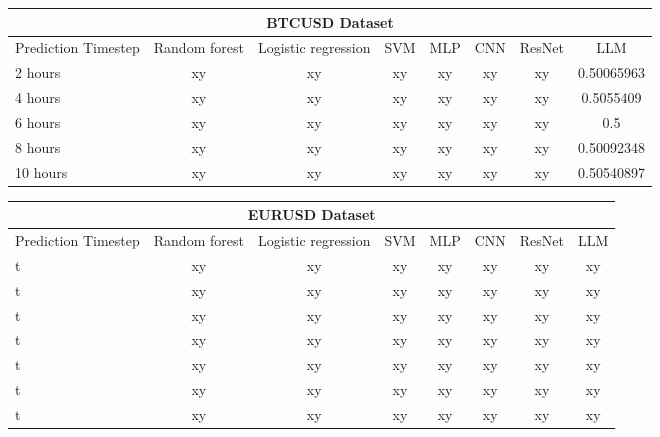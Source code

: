 \begin{center}
	\begin{tabular}{||l || c | c | c | c | c | c | c||}
		\hline
		\multicolumn{8}{|c|}{BTCUSD Dataset}                                                              \\
		\hline
		Prediction Timestep & Random forest & Logistic regression & SVM & MLP & CNN & ResNet & LLM        \\ [0.5ex]
		\hline\hline
		2 hours             & xy            & xy                  & xy  & xy  & xy  & xy     & 0.50065963 \\
		\hline
		4 hours             & xy            & xy                  & xy  & xy  & xy  & xy     & 0.5055409  \\
		\hline
		6 hours             & xy            & xy                  & xy  & xy  & xy  & xy     & 0.5        \\
		\hline
		8 hours             & xy            & xy                  & xy  & xy  & xy  & xy     & 0.50092348 \\
		\hline
		10 hours            & xy            & xy                  & xy  & xy  & xy  & xy     & 0.50540897 \\[1ex]
		\hline
	\end{tabular}
\end{center}
\begin{center}
	\begin{tabular}{||l || c | c | c | c | c | c | c||}
		\hline
		\multicolumn{8}{|c|}{EURUSD Dataset}                                                       \\
		\hline
		Prediction Timestep & Random forest & Logistic regression & SVM & MLP & CNN & ResNet & LLM \\ [0.5ex]
		\hline\hline
		t                   & xy            & xy                  & xy  & xy  & xy  & xy     & xy  \\
		\hline
		t                   & xy            & xy                  & xy  & xy  & xy  & xy     & xy  \\
		\hline
		t                   & xy            & xy                  & xy  & xy  & xy  & xy     & xy  \\
		\hline
		t                   & xy            & xy                  & xy  & xy  & xy  & xy     & xy  \\
		\hline
		t                   & xy            & xy                  & xy  & xy  & xy  & xy     & xy  \\[1ex]
		\hline
		t                   & xy            & xy                  & xy  & xy  & xy  & xy     & xy  \\[1ex]
		\hline
		t                   & xy            & xy                  & xy  & xy  & xy  & xy     & xy  \\[1ex]
		\hline
	\end{tabular}
\end{center}
